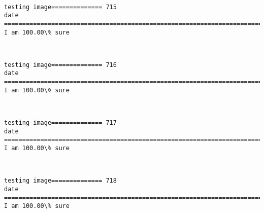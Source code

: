 \documentclass[11pt]{article}
\begin{document}
    \begin{center}
    \end{center}
    { \hspace*{\fill} \\}
    
    \begin{Verbatim}[commandchars=\\\{\}]
testing image============== 715
date
============================================================================
I am 100.00\% sure

    \end{Verbatim}

    \begin{center}
    \end{center}
    { \hspace*{\fill} \\}
    
    \begin{Verbatim}[commandchars=\\\{\}]
testing image============== 716
date
============================================================================
I am 100.00\% sure

    \end{Verbatim}

    \begin{center}
    \end{center}
    { \hspace*{\fill} \\}
    
    \begin{Verbatim}[commandchars=\\\{\}]
testing image============== 717
date
============================================================================
I am 100.00\% sure

    \end{Verbatim}

    \begin{center}
    \end{center}
    { \hspace*{\fill} \\}
    
    \begin{Verbatim}[commandchars=\\\{\}]
testing image============== 718
date
============================================================================
I am 100.00\% sure

    \end{Verbatim}
\end{document}
